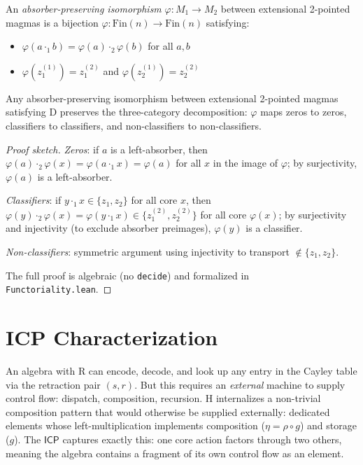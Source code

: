 \documentclass[a4paper,UKenglish,cleveref,autoref,thm-restate]{lipics-v2021}
\newcommand{\dotop}{\cdot}
\newcommand{\ICP}{\textsf{ICP}}
\newcommand{\Fin}{\mathrm{Fin}}
\begin{document}
\begin{definition}
An \emph{absorber-preserving isomorphism} $\varphi : M_1 \to M_2$ between extensional 2-pointed magmas is a bijection $\varphi : \Fin(n) \to \Fin(n)$ satisfying:
\begin{itemize}
  \item $\varphi(a \dotop_1 b) = \varphi(a) \dotop_2 \varphi(b)$ for all $a, b$
  \item $\varphi(z_1^{(1)}) = z_1^{(2)}$ and $\varphi(z_2^{(1)}) = z_2^{(2)}$
\end{itemize}
\end{definition}

\begin{theorem}[Functoriality]
\label{thm:functoriality}
Any absorber-preserving isomorphism between extensional 2-pointed magmas satisfying D preserves the three-category decomposition: $\varphi$ maps zeros to zeros, classifiers to classifiers, and non-classifiers to non-classifiers.
\end{theorem}

\begin{proof}[Proof sketch]
\emph{Zeros}: if $a$ is a left-absorber, then $\varphi(a) \dotop_2 \varphi(x) = \varphi(a \dotop_1 x) = \varphi(a)$ for all $x$ in the image of $\varphi$; by surjectivity, $\varphi(a)$ is a left-absorber.

\emph{Classifiers}: if $y \dotop_1 x \in \{z_1, z_2\}$ for all core $x$, then $\varphi(y) \dotop_2 \varphi(x) = \varphi(y \dotop_1 x) \in \{z_1^{(2)}, z_2^{(2)}\}$ for all core $\varphi(x)$; by surjectivity and injectivity (to exclude absorber preimages), $\varphi(y)$ is a classifier.

\emph{Non-classifiers}: symmetric argument using injectivity to transport $\notin \{z_1, z_2\}$.

The full proof is algebraic (no \texttt{decide}) and formalized in \texttt{Functoriality.lean}.
\end{proof}

\section{ICP Characterization}
\label{sec:icp}

An algebra with R can encode, decode, and look up any entry in the Cayley table via the retraction pair $(s, r)$. But this requires an \emph{external} machine to supply control flow: dispatch, composition, recursion. H internalizes a non-trivial composition pattern that would otherwise be supplied externally: dedicated elements whose left-multiplication implements composition ($\eta = \rho \circ g$) and storage ($g$). The $\ICP$ captures exactly this: one core action factors through two others, meaning the algebra contains a fragment of its own control flow as an element.
\end{document}
